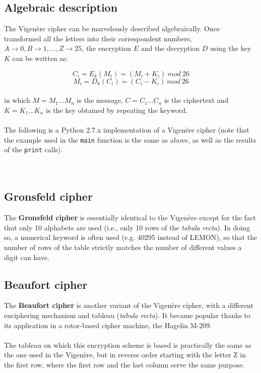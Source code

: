 \documentclass[Lau,binding=0.6cm,oneside]{sapthesis}
\begin{document}
\subsection{Algebraic description}
The Vigenère cipher can be marvelously described algebraically. Once transformed all the letters into their correspondent numbers, $A \rightarrow 0, B \rightarrow 1, ... , Z \rightarrow 25$, the encryption $E$ and the decryption $D$ using the key $K$ can be written as:

\begin{equation}
C_i=E_k{(M_i)}=(M_i + K_i) \ mod \ 26
\end{equation}
\begin{equation}
M_i=D_k{(C_i)}=(C_i - K_i) \ mod \ 26
\end{equation}
\ \\
in which $M = M_1 ... M_n$ is the message, $C = C_1 ... C_n$ is the ciphertext and $K = K_1 ... K_n$ is the key obtained by repeating the keyword.\\\\
The following is a \textsf{Python 2.7.x} implementation of a Vigenère cipher (note that the example used in the \texttt{main} function is the same as above, as well as the results of the \texttt{print} calls).\\\\
\ \\
\subsection{Gronsfeld cipher}
The \textbf{Gronsfeld cipher} is essentially identical to the Vigenère except for the fact that only 10 alphabets are used (i.e., only 10 rows of the \textit{tabula recta}). In doing so, a numerical keyword is often used (e.g. \textsf{40295} instead of \textsf{LEMON}), so that the number of rows of the table strictly matches the number of different values a digit can have.

\subsection{Beaufort cipher}
The \textbf{Beaufort cipher} is another variant of the Vigenère cipher, with a different enciphering mechanism and tableau (\textit{tabula recta}). It became popular thanks to its application in a rotor-based cipher machine, the Hagelin M-209.\\\\
The tableau on which this encryption scheme is based is practically the same as the one used in the Vigenère, but in reverse order starting with the letter \textsf{Z} in the first row, where the first row and the last column serve the same purpose.\\\\
\end{document}
